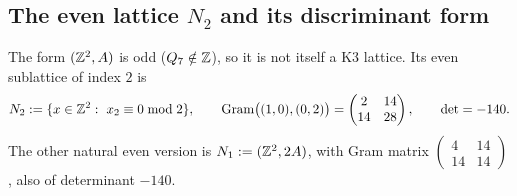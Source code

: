 \subsection{The even lattice $N_2$ and its discriminant form}\label{sec:rev8disc}
The form $(\mathbb{Z}^2,A)$ is odd ($Q_7\notin\mathbb{Z}$), so it is not itself a K3 lattice. Its even sublattice of index $2$ is
\[
N_2:=\{x\in\Z^2:\ x_2\equiv0\bmod2\},\qquad \mathrm{Gram}\big((1,0),(0,2)\big)=\begin{pmatrix}2&14\\14&28\end{pmatrix},\qquad\det=-140 .
\]
The other natural even version is $N_1:=(\mathbb{Z}^2,2A)$, with Gram matrix $\left(\begin{smallmatrix}4&14\\14&14\end{smallmatrix}\right)$, also of determinant $-140$.

